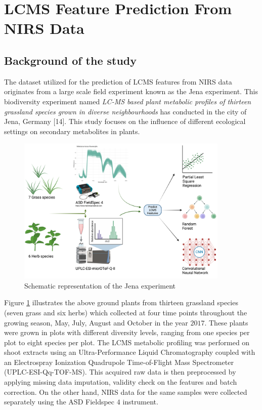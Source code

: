 \documentclass[12pt,a4paper]{report}
\begin{document}
\section{LCMS Feature Prediction From NIRS Data}

\subsection*{Background of the study}
The dataset utilized for the prediction of LCMS features from NIRS data originates from a large scale field experiment known as the Jena experiment. This biodiversity experiment named \textit{LC-MS based plant metabolic profiles of thirteen grassland species grown in diverse neighbourhoods} has conducted in the city of Jena, Germany [14]. This study focuses on the influence of different ecological settings on secondary metabolites in plants. \\

\begin{figure}[h]
    \centering
    \includegraphics[width=0.9\textwidth]{Figures/LCMS.png}
    \caption{Schematic representation of the Jena experiment}
    \label{fig:lcms}
\end{figure}

Figure \ref{fig:lcms} illustrates the above ground plants from thirteen grassland species (seven grass and six herbs) which collected at four time points throughout the growing season, May, July, August and October in the year $2017$. These plants were grown in plots with different diversity levels, ranging from one species per plot to eight species per plot. The LCMS metabolic profiling was performed on shoot extracts using an Ultra-Performance Liquid Chromatography coupled with an Electrospray Ionization Quadrupole Time-of-Flight Mass Spectrometer (UPLC-ESI-Qq-TOF-MS). This acquired raw data is then preprocessed by applying missing data imputation, validity check on the features and batch correction. On the other hand, NIRS data for the same samples were collected separately using the ASD Fieldspec $4$ instrument. \\
\end{document}
